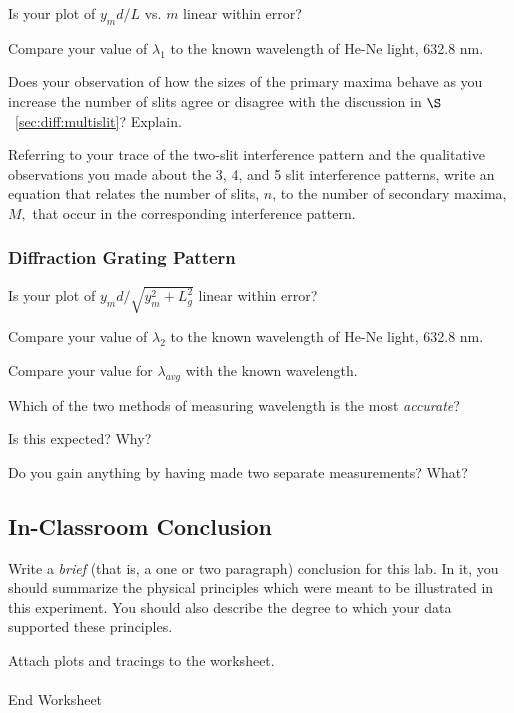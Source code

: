 \noindent
Is your plot of $y_md/L$ vs. $m$ linear within error?
\vspace*{.3cm}

\noindent
Compare your value of $\lambda _1$ to the known wavelength of He-Ne
light, 632.8 nm.
\vspace*{2.5cm} 

\noindent
Does your observation of how the sizes of the primary maxima behave as
you increase the number of slits agree or disagree with the discussion
in $\S$~\ref{sec:diff:multislit}? Explain.
\vspace*{3cm}
  

\noindent
Referring to your trace of the two-slit interference pattern and the
qualitative observations you made about the 3, 4, and 5 slit
interference patterns, write an equation that relates the number of
slits, $n$, to the number of secondary maxima, $M,$ that occur in the
corresponding interference pattern. \\
\vspace*{2cm}


\subsubsection{Diffraction Grating Pattern}
Is your plot of $y_md/ \sqrt{y_m^2 + L_g^2}$ linear within error?
\vspace*{.3cm}

\noindent
Compare your value of $\lambda _2$ to the known wavelength of He-Ne
light, 632.8 nm.
\vspace*{1.4 cm}

\newpage


\noindent
Compare your value for $\lambda _{avg}$ with the known wavelength.
\vspace*{2.4cm}

\noindent
Which of the two methods of measuring wavelength is the most {\it
accurate}?
\vspace*{2cm}

\noindent
Is this expected? Why?
\vspace*{1cm}

\noindent
Do you gain anything by having made two separate measurements? What?
\vspace*{1.4cm} 

\newpage
\subsection{In-Classroom Conclusion}

Write a {\it brief} (that is, a one or two paragraph) conclusion for
this lab. In it, you should summarize the physical
principles which were meant to be illustrated in this experiment. You
should also describe the degree to which your data supported these
principles.


\vfill
\noindent Attach plots and tracings to the worksheet. \\
\ \\
{\Large End Worksheet} 

\renewcommand{\thesection}{\thechapter.\arabic{section}}

